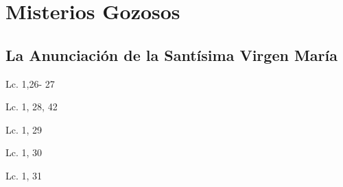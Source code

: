 \documentclass[a4paper,11pt,sans]{article}
\begin{document}
  \section*{\hfil Misterios Gozosos \hfil}
    \subsection*{\hfil La Anunciación de la Santísima Virgen María \hfil}
      
      \begin{multicols}{2}

      \columnbreak
          
      \end{multicols}
      \begin{center}
        Lc. 1,26- 27           
      \end{center}
      
      \begin{multicols}{2}

      \columnbreak
          
      \end{multicols}
      \begin{center}
        Lc. 1, 28, 42      
      \end{center}
      
      \begin{multicols}{2}

      \columnbreak
          
      \end{multicols}
      \begin{center}
        Lc. 1, 29         
      \end{center}
      
      \begin{multicols}{2}

      \columnbreak
          
      \end{multicols}
      \begin{center}
        Lc. 1, 30         
      \end{center}
      
      \begin{multicols}{2}

      \columnbreak
          
      \end{multicols}
      \begin{center}
        Lc. 1, 31      
      \end{center}
\end{document}
